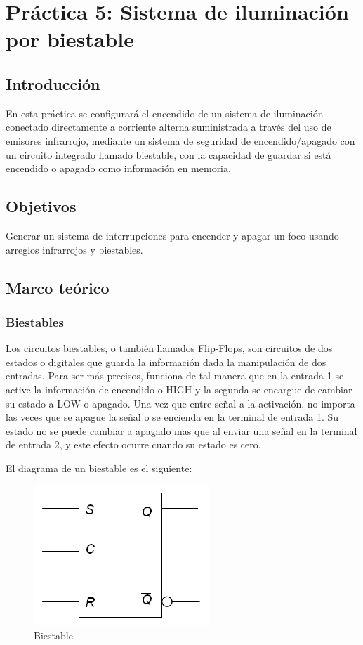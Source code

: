 \clearpage

\section{Práctica 5: Sistema de iluminación por biestable}

\subsection{Introducción}
En esta práctica se configurará el encendido de un sistema de iluminación conectado directamente a corriente alterna suministrada
a través del uso de emisores infrarrojo, mediante un sistema de seguridad de encendido/apagado con un circuito integrado
llamado biestable, con la capacidad de guardar si está encendido o apagado como información en memoria.

\subsection{Objetivos}
Generar un sistema de interrupciones para encender y apagar un foco usando arreglos infrarrojos y biestables.


\subsection{Marco teórico}
\subsubsection{Biestables}
Los circuitos biestables, o también llamados Flip-Flops, son circuitos de dos estados o digitales que guarda la información
dada la manipulación de dos entradas. Para ser más precisos, funciona de tal manera que en la entrada 1 se active la información
de encendido o HIGH y la segunda se encargue de cambiar su estado a LOW o apagado. Una vez que entre señal a la activación, no
importa las veces que se apague la señal o se encienda en la terminal de entrada 1. Su estado no se puede cambiar a apagado mas
que al enviar una señal en la terminal de entrada 2, y este efecto ocurre cuando su estado es cero.
\parencite{markovic2001analysis}

El diagrama de un biestable es el siguiente:

\begin{figure}[ht]
    \centering
    \includegraphics[scale=0.5]{media/Biestable.jpg}
    \caption{Biestable}
    \label{Fig: Circuito biestable}
\end{figure}

